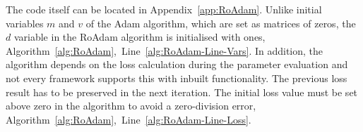 
%
%
{
The code itself can be located in Appendix~\ref{app:RoAdam}.
}
{}
Unlike initial variables $m$ and $v$ of the Adam algorithm, which are set as matrices of zeros, the $d$ variable in the RoAdam algorithm is initialised with ones, \mbox{Algorithm~\ref{alg:RoAdam}, Line~\ref{alg:RoAdam-Line-Vars}}.
In addition, the algorithm depends on the loss calculation during the parameter evaluation and not every framework supports this with inbuilt functionality.
The previous loss result has to be preserved in the next iteration.
The initial loss value must be set above zero in the algorithm to avoid a zero-division error, \mbox{Algorithm~\ref{alg:RoAdam}, Line~\ref{alg:RoAdam-Line-Loss}}.
